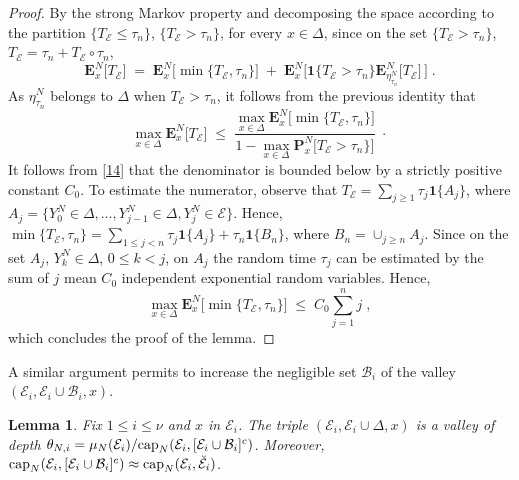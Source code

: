 \documentclass[reqno]{amsart}
\newtheorem{lemma}[theorem]{Lemma}
\begin{document}
\begin{proof}
By the strong Markov property and decomposing the space according to
the partition $\{T_{{{\mathcal E}}} \le \tau_n\}$, $\{T_{{{\mathcal E}}} > \tau_n\}$,
for every $x\in \Delta$, since on the set $\{T_{{{\mathcal E}}} > \tau_n\}$,
$T_{{{\mathcal E}}} = \tau_n + T_{{{\mathcal E}}} \circ \tau_n$,
\begin{equation*}
{{\mathbf E}}^N_x \big[ T_{{{\mathcal E}}} \big] \;=\; {{\mathbf E}}^N_x \big[ \min\{ T_{{{\mathcal E}}}, \tau_n \}  \big] \;+\; {{\mathbf E}}^N_x \big[ {{\mathbf 1}} \{T_{{{\mathcal E}}} >
\tau_n\} {{\mathbf E}}^N_{\eta^N_{\tau_n}} \big[ T_{{{\mathcal E}}}  \big] \, \big] \;.
\end{equation*}
As $\eta^N_{\tau_n}$ belongs to $\Delta$ when $T_{{{\mathcal E}}} > \tau_n$, it
follows from the previous identity that
\begin{equation*}
\max_{x\in \Delta} {{\mathbf E}}^N_x \big[ T_{{{\mathcal E}}} \big]
\;\le\; \frac{\max_{x\in \Delta} {{\mathbf E}}^N_x \big[ 
\min\{ T_{{{\mathcal E}}}, \tau_n \} \big]}{1 - \max_{x\in \Delta} 
{{\mathbf P}}^N_x \big[ T_{{{\mathcal E}}} > \tau_n\} \big]} \;\cdot
\end{equation*}
It follows from \eqref{14} that the denominator is bounded below by a
strictly positive constant $C_0$. To estimate the numerator, observe
that $T_{{{\mathcal E}}} = \sum_{j\ge 1} \tau_j {{\mathbf 1}}\{A_j\}$, where $A_j = \{
Y^N_0\in \Delta, \dots, Y^N_{j-1} \in \Delta, Y^N_j \in {{\mathcal E}}\}$. Hence,
$\min\{ T_{{{\mathcal E}}}, \tau_n \} = \sum_{1\le j< n} \tau_j {{\mathbf 1}}\{A_j\} +
\tau_n {{\mathbf 1}}\{B_n\}$, where $B_n = \cup_{j\ge n}A_j$. Since on the set
$A_j$, $Y^N_k \in \Delta$, $0\le k<j$, on $A_j$ the random time $\tau_j$
can be estimated by the sum of $j$ mean $C_0$ independent exponential
random variables. Hence,
\begin{equation*}
\max_{x\in \Delta} {{\mathbf E}}^N_x \big[ \min\{ T_{{{\mathcal E}}}, \tau_n \} \big]
\;\le\; C_0 \sum_{j=1}^n j \;,
\end{equation*}
which concludes the proof of the lemma.
\end{proof}

A similar argument permits to increase the negligible set ${{\mathcal B}}_i$ of
the valley $({{\mathcal E}}_i, {{\mathcal E}}_i \cup {{\mathcal B}}_i, x)$.

\begin{lemma}
\label{s06}
Fix $1\le i\le \nu$ and $x$ in ${{\mathcal E}}_i$.  The triple $({{\mathcal E}}_i, {{\mathcal E}}_i \cup \Delta, x)$ is a valley of depth $\theta_{N,i} = \mu_N({{\mathcal E}}_i)/{{\rm cap}}_N({{\mathcal E}}_i , [{{\mathcal E}}_i \cup {{\mathcal B}}_i]^c)$. Moreover,
${{\rm cap}}_N({{\mathcal E}}_i , [{{\mathcal E}}_i \cup {{\mathcal B}}_i]^c) \approx {{\rm cap}}_N({{\mathcal E}}_i ,
\breve{{{\mathcal E}}}_i)$.
\end{lemma}
\end{document}
